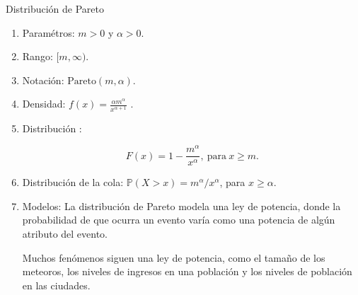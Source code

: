 \documentclass[10pt]{beamer}
\begin{document}
\begin{frame}{Distribuci\'on de Pareto}
\small{ 
\begin{enumerate}
\item Param\'etros: $m > 0 $ y  $\alpha > 0$.
\item Rango: $[m, \infty )$.
\item Notaci\'on: $\text{Pareto}(m, \alpha)$.
\item Densidad: $f(x) = \frac{\alpha m^{\alpha}}{x^{\alpha + 1}}$ .
\item Distribuci\'on : 
	
	\[
	F(x) = 1 - \frac{m^\alpha}{x^\alpha},\ \text{para}\ x \geq m.
	\]
	
\item Distribuci\'on  de la cola: $\mathbb{P}(X > x) = m^{\alpha}/x^{\alpha}$, para  $x \geq \alpha$.
\item Modelos: La distribuci\'on de Pareto modela una ley de potencia, donde la probabilidad de que ocurra un evento var\'ia como una potencia de alg\'un atributo del evento.

Muchos fen\'omenos siguen una ley de potencia, como el tama\~no de los meteoros, los niveles de ingresos en una poblaci\'on y los niveles de poblaci\'on en las ciudades.
\end{enumerate}

}
\end{frame}
\end{document}
